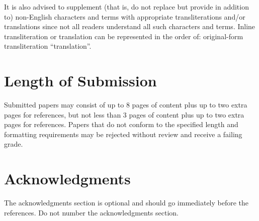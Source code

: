\documentclass[11pt,table,xcdraw]{article}
\begin{document}
It is also advised to supplement (that is, do not replace but provide in addition to) non-English characters and terms with appropriate transliterations and/or translations since not all readers understand all such characters and terms. Inline transliteration or translation can be represented in the order of: original-form transliteration ``translation''.

\section{Length of Submission}
\label{sec:length}

Submitted papers may consist of up to 8 pages of content plus up to two extra pages for references, but not less than 3 pages of content plus up to two extra pages for references.  Papers that do not conform to the specified length and formatting requirements may be
rejected without review and receive a failing grade.



\section*{Acknowledgments}

The acknowledgments section is optional and should go immediately before the references.  Do
not number the acknowledgments section.



\end{document}
